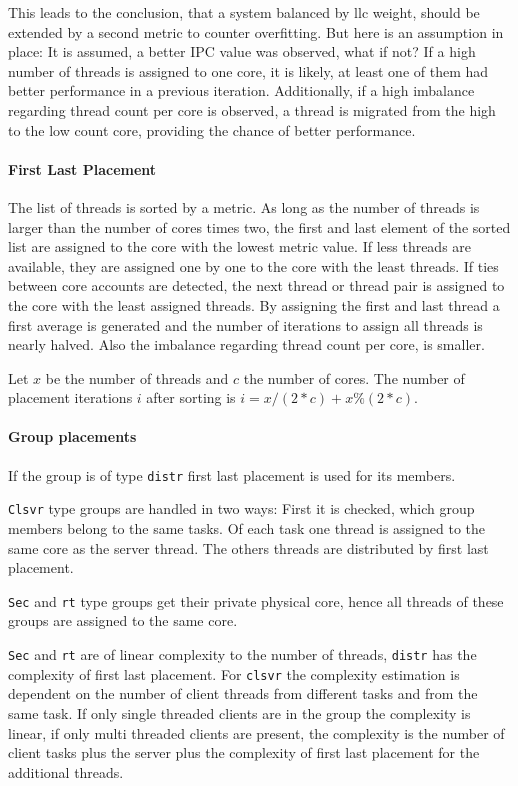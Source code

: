 This leads to the conclusion, that a system balanced by \gls{llc} weight,
should be extended by a second metric to counter overfitting.
But here is an assumption in place: It is assumed, a better IPC value was
observed, what if not?
If a high number of threads is assigned to one core, it is likely, at least one
of them had better performance in a previous iteration.
Additionally, if a high imbalance regarding thread count per core is observed,
a thread is migrated from the high to the low count core, providing the chance
of better performance.


\paragraph{First Last Placement}
The list of threads is sorted by a metric.
As long as the number of threads is larger than the number of cores times two,
the first and last element of the sorted list are assigned to the core with the
lowest metric value.
If less threads are available, they are assigned one by one to the core with
the least threads.
If ties between core accounts are detected, the next thread or thread pair is
assigned to the core with the least assigned threads.
By assigning the first and last thread a first average is generated and the
number of iterations to assign all threads is nearly halved.
Also the imbalance regarding thread count per core, is smaller.

Let $x$ be the number of threads and $c$ the number of cores.
The number of placement iterations $i$ after sorting is
$i = x / (2*c) + x \% (2*c)$.


\paragraph{Group placements}
If the group is of type \texttt{distr} first last placement is used for its
members.

\texttt{Clsvr} type groups are handled in two ways: First it is checked, which
group members belong to the same tasks.
Of each task one thread is assigned to the same core as the server thread.
The others threads are distributed by first last placement.

\texttt{Sec} and \texttt{rt} type groups get their private physical core, hence
all threads of these groups are assigned to the same core.

\texttt{Sec} and \texttt{rt} are of linear complexity to the number of threads,
\texttt{distr} has the complexity of first last placement.
For \texttt{clsvr} the complexity estimation is dependent on the number of client
threads from different tasks and from the same task.
If only single threaded clients are in the group the complexity is linear, if
only multi threaded clients are present, the complexity is the number of
client tasks plus the server plus the complexity of first last placement for
the additional threads.


